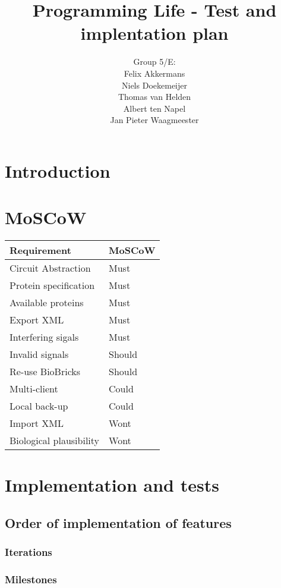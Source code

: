 \documentclass[a4paper]{article}
\title{Programming Life - Test and implentation plan }
\author{Group 5/E:\\
Felix Akkermans \\
Niels Doekemeijer \\
Thomas van Helden \\
Albert ten Napel \\
Jan Pieter Waagmeester}
\begin{document}
\maketitle

\vfill

\small{\tableofcontents}
\pagebreak

\section{Introduction}

\section{MoSCoW}
\begin{tabular}{ll}
Requirement & MoSCoW\\[2mm] \hline
Circuit Abstraction & Must \\
Protein specification & Must \\
Available proteins & Must \\
Export XML & Must \\
Interfering sigals & Must \\
Invalid signals & Should \\
Re-use BioBricks & Should \\
Multi-client & Could \\
Local back-up & Could \\
Import XML & Wont \\
Biological plausibility & Wont \\

\end{tabular}

\section{Implementation and tests}

\subsection{Order of implementation of features}

\subsubsection{Iterations}

\subsubsection{Milestones}
\end{document}
